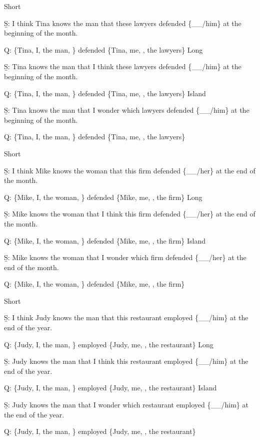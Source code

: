 \pex 
\a Short\par\nobreak
\beginsubsub
\b{S:} I think Tina knows the man that these lawyers defended \{\_\_/him\} at the beginning of the month.\par\nobreak
\b{Q:} \{Tina, I, the man, \} defended \{Tina, me, , the lawyers\}
\endsubsub
\a Long\par\nobreak
\beginsubsub
\b{S:} Tina knows the man that I think these lawyers defended \{\_\_/him\} at the beginning of the month.\par\nobreak
\b{Q:} \{Tina, I, the man, \} defended \{Tina, me, , the lawyers\}
\endsubsub
\a Island\par\nobreak
\beginsubsub
\b{S:} Tina knows the man that I wonder which lawyers defended \{\_\_/him\} at the beginning of the month.\par\nobreak
\b{Q:} \{Tina, I, the man, \} defended \{Tina, me, , the lawyers\}
\endsubsub
\xe

\pex 
\a Short\par\nobreak
\beginsubsub
\b{S:} I think Mike knows the woman that this firm defended \{\_\_/her\} at the end of the month.\par\nobreak
\b{Q:} \{Mike, I, the woman, \} defended \{Mike, me, , the firm\}
\endsubsub
\a Long\par\nobreak
\beginsubsub
\b{S:} Mike knows the woman that I think this firm defended \{\_\_/her\} at the end of the month.\par\nobreak
\b{Q:} \{Mike, I, the woman, \} defended \{Mike, me, , the firm\}
\endsubsub
\a Island\par\nobreak
\beginsubsub
\b{S:} Mike knows the woman that I wonder which firm defended \{\_\_/her\} at the end of the month.\par\nobreak
\b{Q:} \{Mike, I, the woman, \} defended \{Mike, me, , the firm\}
\endsubsub
\xe

\pex 
\a Short\par\nobreak
\beginsubsub
\b{S:} I think Judy knows the man that this restaurant employed \{\_\_/him\} at the end of the year.\par\nobreak
\b{Q:} \{Judy, I, the man, \} employed \{Judy, me, , the restaurant\}
\endsubsub
\a Long\par\nobreak
\beginsubsub
\b{S:} Judy knows the man that I think this restaurant employed \{\_\_/him\} at the end of the year.\par\nobreak
\b{Q:} \{Judy, I, the man, \} employed \{Judy, me, , the restaurant\}
\endsubsub
\a Island\par\nobreak
\beginsubsub
\b{S:} Judy knows the man that I wonder which restaurant employed \{\_\_/him\} at the end of the year.\par\nobreak
\b{Q:} \{Judy, I, the man, \} employed \{Judy, me, , the restaurant\}
\endsubsub
\xe

